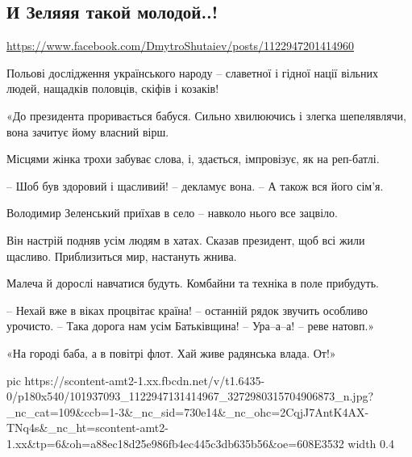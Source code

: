  
 
 
 
 

\subsection{И Зеляяя такой молодой..!}
\label{sec:09_06_2020.fb.shutajev_dmitrij.1.zelja}
\url{https://www.facebook.com/DmytroShutaiev/posts/1122947201414960}

Польові дослідження українського народу – славетної і гідної нації вільних людей, нащадків половців, скіфів і козаків!

«До президента проривається бабуся. Сильно хвилюючись і злегка шепелявлячи, вона зачитує йому власний вірш.

Місцями жінка трохи забуває слова, і, здається, імпровізує, як на реп-батлі.

– Шоб був здоровий і щасливий! – декламує вона. – А також вся його сім’я.

Володимир Зеленський приїхав в село – навколо нього все зацвіло.

Він настрій подняв усім людям в хатах. Сказав президент, щоб всі жили щасливо. Приблизиться мир, настануть жнива.

Малеча й дорослі навчатися будуть. Комбайни та техніка в поле прибудуть.

– Нехай вже в віках процвітає країна! – останній рядок звучить особливо урочисто. – Така дорога нам усім Батьківщина!
– Ура–а–а! – реве натовп.»

«На городі баба,
а в повітрі флот.
Хай живе радянська влада.
От!»


\ifcmt
  pic https://scontent-amt2-1.xx.fbcdn.net/v/t1.6435-0/p180x540/101937093_1122947131414967_3272980315704906873_n.jpg?_nc_cat=109&ccb=1-3&_nc_sid=730e14&_nc_ohc=2CqjJ7AntK4AX-TNq4s&_nc_ht=scontent-amt2-1.xx&tp=6&oh=a88ec18d25e986fb4ec445c3db635b56&oe=608E3532
  width 0.4
\fi

